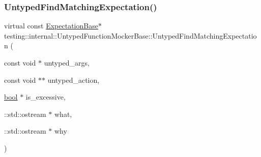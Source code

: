 \subsubsection{\texorpdfstring{Untyped\+Find\+Matching\+Expectation()}{UntypedFindMatchingExpectation()}}
{\footnotesize\ttfamily virtual const \hyperlink{classtesting_1_1internal_1_1ExpectationBase}{Expectation\+Base}$\ast$ testing\+::internal\+::\+Untyped\+Function\+Mocker\+Base\+::\+Untyped\+Find\+Matching\+Expectation (\begin{DoxyParamCaption}\item[{const void $\ast$}]{untyped\+\_\+args,  }\item[{const void $\ast$$\ast$}]{untyped\+\_\+action,  }\item[{\hyperlink{classbool}{bool} $\ast$}]{is\+\_\+excessive,  }\item[{\+::std\+::ostream $\ast$}]{what,  }\item[{\+::std\+::ostream $\ast$}]{why }\end{DoxyParamCaption})\hspace{0.3cm}{\ttfamily [pure virtual]}}



